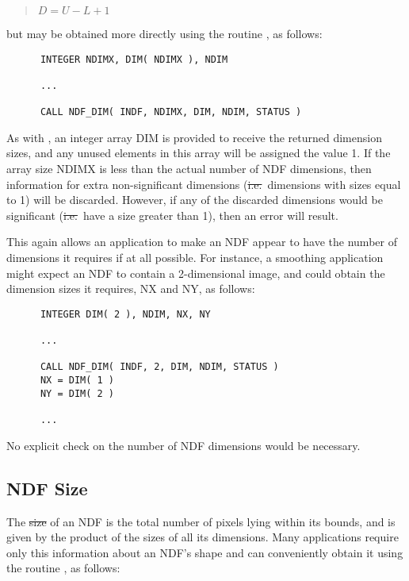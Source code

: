\small
\begin{quote}
\begin{center}
$D = U - L + 1$
\end{center}
\end{quote}
\normalsize

but may be obtained more directly using the routine , as follows: 

\small
\begin{verbatim}
      INTEGER NDIMX, DIM( NDIMX ), NDIM

      ...

      CALL NDF_DIM( INDF, NDIMX, DIM, NDIM, STATUS )
\end{verbatim}
\normalsize

As with , an integer array DIM is provided to receive the returned
dimension sizes, and any unused elements in this array will be assigned the
value 1. 
If the array size NDIMX is less than the actual number of NDF dimensions, then
information for extra non-significant dimensions (\st{i.e.}\ dimensions with
sizes equal to 1) will be discarded.
However, if any of the discarded dimensions would be significant
(\st{i.e.}\ have a size greater than 1), then an error will result.

This again allows an application to make an NDF appear to have the number 
of dimensions it requires if at all possible.
For instance, a smoothing application might expect an NDF to contain a
2-dimensional image, and could obtain the dimension sizes it requires, NX
and NY, as follows: 

\small
\begin{verbatim}
      INTEGER DIM( 2 ), NDIM, NX, NY

      ...

      CALL NDF_DIM( INDF, 2, DIM, NDIM, STATUS )
      NX = DIM( 1 )
      NY = DIM( 2 )

      ...
\end{verbatim}
\normalsize

No explicit check on the number of NDF dimensions would be necessary. 

\subsection{NDF Size}

The \st{size\/} of an NDF is the total number of pixels lying within its
bounds, and is given by the product of the sizes of all its dimensions. 
Many applications require only this information about an NDF's  shape and can
conveniently obtain it using the routine , as  follows:

